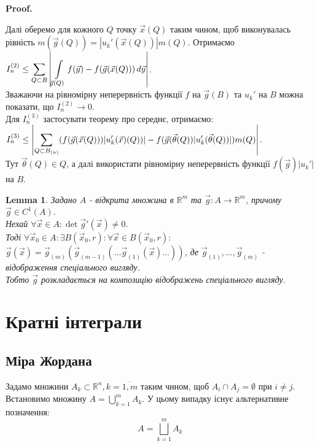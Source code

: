 \documentclass[a4paper, 10pt]{article}
\makeatletter
\def\huge{\displaystyle}
\def\qed{$\blacksquare$}
\theoremstyle{theoremdd}
\theoremstyle{theoremdd}
\theoremstyle{theoremdd}
\theoremstyle{theoremdd}
\theoremstyle{theoremdd}
\theoremstyle{theoremdd}
\theoremstyle{theoremdd}
\newtheorem{lemma}[theorem]{Lemma}
\theoremstyle{theoremdd}
\renewenvironment{proof}[1][Proof.\\]{\par
\pushQED{\hfill \qed}%
\normalfont \topsep6\p@\@plus6\p@\relax
\trivlist
\item\relax
{\bfseries
#1\@addpunct{.}}\hspace\labelsep\ignorespaces
}{%
\popQED\endtrivlist\@endpefalse
}
\makeatother
\begin{document}
\begin{proof}
Далі оберемо для кожного $Q$ точку $\vec{x}(Q)$ таким чином, щоб виконувалась рівність $m(\vec{g}(Q)) = |u_k'(\vec{x}(Q))| m(Q)$. Отримаємо\\
$I_n^{(2)} \leq \displaystyle\sum_{Q \subset B} \abs{\int\displaylimits_{\vec{g}(Q)} f(\vec{y}) - f(\vec{g}(\vec{x}(Q)))\,d\vec{y} }$.\\
Зважаючи на рівномірну неперервність функції $f$ на $\vec{g}(B)$ та $u_k'$ на $B$ можна показати, що $I_n^{(2)} \to 0$.\\
Для $I_n^{(3)}$ застосувати теорему про середнє, отримаємо:\\
$I_n^{(3)} \leq \displaystyle\abs{\sum_{Q \subset B_{(n)}} (f(\vec{g}(\vec{x}(Q))) |u_k'(\vec{x})(Q))| - f(\vec{g}(\vec{\theta}(Q)) |u_k'(\vec{\theta}(Q))|) m(Q) }$.\\
Тут $\vec{\theta}(Q) \in Q$, а далі використати рівномірну неперервність функції $f(\vec{g}) |u_k'|$ на $B$.
\end{proof}

\begin{lemma}
Задано $A$ - відкрита множина в $\mathbb{R}^m$ та $\vec{g}: A \to \mathbb{R}^m$, причому $\vec{g} \in C^{1}(A)$.\\
Нехай $\forall \vec{x} \in A: \det \vec{g}'(\vec{x}) \neq 0$.\\
Тоді $\forall \vec{x}_0 \in A: \exists B(\vec{x}_0,r): \forall \vec{x} \in B(\vec{x}_0,r):$\\
$\vec{g}(\vec{x}) = \vec{g}_{(m)}( \vec{g}_{(m-1)} (\dots \vec{g}_{(1)} (\vec{x}) \dots ) )$, де $\vec{g}_{(1)},\dots,\vec{g}_{(m)}$ - відображення спеціального вигляду.\\
Тобто $\vec{g}$ розкладається на композицію відображень спеціального вигляду.
\end{lemma}

\iffalse
\section{Кратні інтеграли}
\subsection{Міра Жордана}
Задамо множини $A_k \subset \mathbb{R}^n, k = \overline{1,m}$ таким чином, щоб $A_i \cap A_j = \emptyset$ при $i \neq j$. Встановимо множину $A = \huge\bigcup_{k=1}^m A_k$. У цьому випадку існує альтернативне позначення:
$$ A = \bigsqcup_{k=1}^m A_k $$
\end{document}

